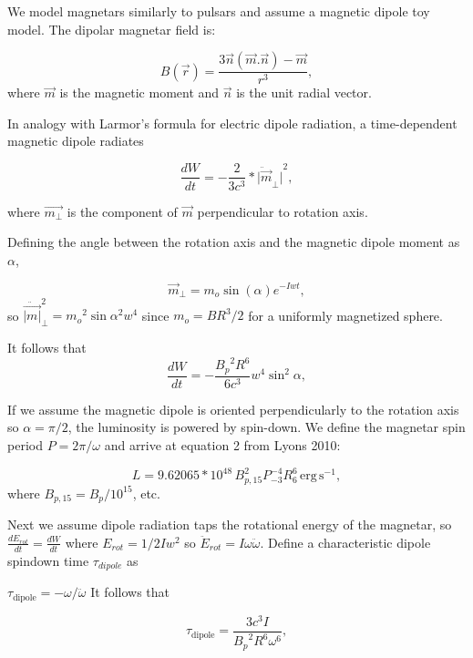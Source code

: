 \documentclass{article}
\begin{document}
We model magnetars similarly to pulsars and assume a magnetic dipole toy model. The dipolar magnetar field is:

\begin{equation} B(\vec{r})=\frac{3\vec{n}(\vec{m}.\vec{n})-\vec{m}}{r^3}, \end{equation}
where $\vec{m}$ is the magnetic moment and $\vec{n}$ is the unit radial vector.

In analogy with Larmor's formula for electric dipole radiation, a time-dependent magnetic dipole radiates

\begin{equation}
\frac{dW}{dt} = -\frac{2}{3c^3} *{\ddot{|\vec{m}}_\perp|}^2,
\end{equation}

where $\vec{m_\perp}$ is the component of $\vec{m}$ perpendicular to rotation axis.

Defining the angle between the rotation axis and the magnetic dipole moment as $\alpha$,

\begin{equation}\vec{m}_\perp = m_o  \sin({\alpha}) e^{-Iwt},\end{equation}
so $\ddot{\vec{|m|}}_\perp^2 = {m_o}^2 \sin{\alpha}^2 w^4$
since $m_o = B R^3/2$ for a uniformly magnetized sphere.

It follows that \begin{equation} \label{eq:lumin}\frac{dW}{dt} = -\frac{{B_p}^2 R^6}{6c^3} w^4 \sin^2{\alpha},\end{equation}

If we assume the magnetic dipole is oriented perpendicularly to the rotation axis so $\alpha=\pi/2$, the luminosity is powered by spin-down. We define the magnetar spin period $P= 2\pi/\omega$ and arrive at equation 2 from Lyons 2010:

\begin{equation} L  = 9.62065*10^{48}\, B^2_{p,15} P^{-4}_{-3} R^6_ 6\,\mathrm{erg \,s^{-1}},\end{equation}
where $B_{p,15} = B_p/10^{15}$, etc.

Next we assume dipole radiation taps the rotational energy of the magnetar, so $\frac{dE_{rot}}{dt} = \frac{dW}{dt}$ where $E_{rot} = 1/2 I w^2$ so $\ddot{E}_{rot} = I \omega \ddot{\omega}$. Define a characteristic dipole spindown time $\tau_{dipole}$ as

$\tau_{\mathrm{dipole}} = - \omega/\ddot{\omega}$
It follows that

\begin{equation}\tau_{\mathrm{dipole}} = \frac{3c^3 I}{{B_p}^2 R^6 \omega^6},
\end{equation}
\end{document}
